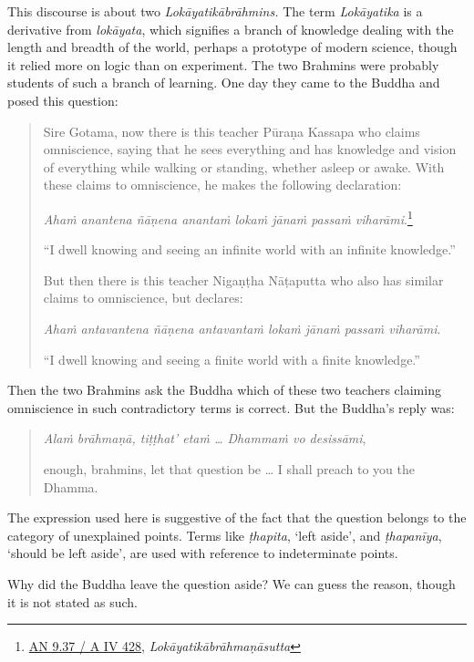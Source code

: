 This discourse is about two \emph{Lokāyatikābrāhmins.} The term \emph{Lokāyatika} is a derivative from \emph{lokāyata}, which signifies a branch of knowledge dealing with the length and breadth of the world, perhaps a prototype of modern science, though it relied more on logic than on experiment. The two Brahmins were probably students of such a branch of learning. One day they came to the Buddha and posed this question:

\begin{quote}
Sire Gotama, now there is this teacher Pūraṇa Kassapa who claims omniscience, saying that he sees everything and has knowledge and vision of everything while walking or standing, whether asleep or awake. With these claims to omniscience, he makes the following declaration:

\clearpage

\emph{Ahaṁ anantena ñāṇena anantaṁ lokaṁ jānaṁ passaṁ viharāmi}.\footnote{\href{https://suttacentral.net/an9.37/pli/ms}{AN 9.37 / A IV 428}, \emph{Lokāyatikābrāhmaṇāsutta}}

``I dwell knowing and seeing an infinite world with an infinite knowledge.''

But then there is this teacher Nigaṇṭha Nāṭaputta who also has similar claims to omniscience, but declares:

\emph{Ahaṁ antavantena ñāṇena antavantaṁ lokaṁ jānaṁ passaṁ viharāmi}.

``I dwell knowing and seeing a finite world with a finite knowledge.''
\end{quote}

Then the two Brahmins ask the Buddha which of these two teachers claiming omniscience in such contradictory terms is correct. But the Buddha's reply was:

\begin{quote}
\emph{Alaṁ brāhmaṇā, tiṭṭhat' etaṁ \ldots{} Dhammaṁ vo desissāmi},

enough, brahmins, let that question be \ldots{} I shall preach to you the Dhamma.
\end{quote}

The expression used here is suggestive of the fact that the question belongs to the category of unexplained points. Terms like \emph{ṭhapita}, `left aside', and \emph{ṭhapanīya}, `should be left aside', are used with reference to indeterminate points.

Why did the Buddha leave the question aside? We can guess the reason, though it is not stated as such.

